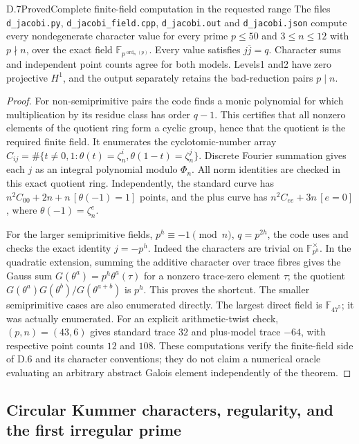 \begin{statement}{D.7}{Proved}{Complete finite-field computation in the requested range}
The files \texttt{d\_jacobi.py}, \texttt{d\_jacobi\_field.cpp}, \texttt{d\_jacobi.out} and \texttt{d\_jacobi.json} compute every nondegenerate character value for every prime $p\leq50$ and $3\leq n\leq12$ with $p\nmid n$, over the exact field $\mathbb F_{p^{\operatorname{ord}_n(p)}}$. Every value satisfies $j\overline j=q$. Character sums and independent point counts agree for both models. Levels1 and2 have zero projective $H^1$, and the output separately retains the bad-reduction pairs $p\mid n$.
\end{statement}
\begin{proof}
For non-semiprimitive pairs the code finds a monic polynomial for which multiplication by its residue class has order $q-1$. This certifies that all nonzero elements of the quotient ring form a cyclic group, hence that the quotient is the required finite field. It enumerates the cyclotomic-number array
$C_{ij}=\#\{t\ne0,1:\theta(t)=\zeta_n^i,\theta(1-t)=\zeta_n^j\}$.
Discrete Fourier summation gives each $j$ as an integral polynomial modulo $\Phi_n$. All norm identities are checked in this exact quotient ring. Independently, the standard curve has
$n^2C_{00}+2n+n\,[\theta(-1)=1]$ points, and the plus curve has
$n^2C_{ee}+3n\,[e=0]$, where $\theta(-1)=\zeta_n^e$.

For the larger semiprimitive fields, $p^h\equiv-1\pmod n$, $q=p^{2h}$, the code uses and checks the exact identity $j=-p^h$. Indeed the characters are trivial on $\mathbb F_{p^h}^\times$. In the quadratic extension, summing the additive character over trace fibres gives the Gauss sum $G(\theta^a)=p^h\theta^a(\tau)$ for a nonzero trace-zero element $\tau$; the quotient $G(\theta^a)G(\theta^b)/G(\theta^{a+b})$ is $p^h$. This proves the shortcut. The smaller semiprimitive cases are also enumerated directly. The largest direct field is $\mathbb F_{47^5}$; it was actually enumerated. For an explicit arithmetic-twist check, $(p,n)=(43,6)$ gives standard trace $32$ and plus-model trace $-64$, with respective point counts $12$ and $108$. These computations verify the finite-field side of D.6 and its character conventions; they do not claim a numerical oracle evaluating an arbitrary abstract Galois element independently of the theorem.
\end{proof}

\subsection{Circular Kummer characters, regularity, and the first irregular prime}

